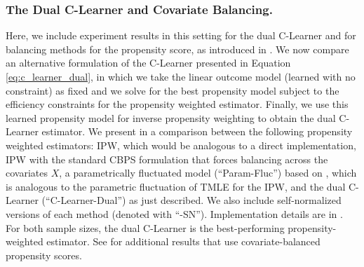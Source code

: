 \ifdefined\response\newpage\newpage\clearpage\pagebreak\else\fi
\subsubsection{The Dual C-Learner and Covariate Balancing.}
\label{sec:ks_ipw}
Here, we include experiment results in this setting for the dual C-Learner and for balancing methods for the propensity score, as introduced in . We now compare an alternative formulation of the C-Learner presented in Equation \eqref{eq:c_learner_dual}, in which we take the linear outcome model (learned with no constraint) as fixed and we solve for the best propensity model subject to the efficiency constraints for the propensity weighted estimator. Finally, we use this learned propensity model for inverse propensity weighting to obtain the dual C-Learner estimator. We present in  a comparison between the following propensity weighted estimators: IPW, which would be analogous to a direct implementation, IPW with the standard CBPS formulation that forces balancing across the covariates $X$, a parametrically fluctuated model (``Param-Fluc'') based on \cite{tan2010bounded}, which is analogous to the parametric fluctuation of TMLE for the IPW, and the dual C-Learner (``C-Learner-Dual'') as just described. We also include self-normalized versions of each method (denoted with ``-SN''). Implementation details are in . For both sample sizes, the dual C-Learner is the best-performing propensity-weighted estimator.
See   for additional results that use covariate-balanced propensity scores. 

